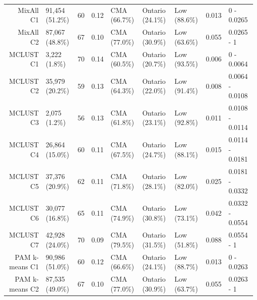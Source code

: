 \documentclass[11pt, a4paper]{article}
\begin{document}
\begin{table}[H]
{\begin{tabular}{|r|llllllll|}
  MixAll C1 & 91,454 (51.2\%) & 60 & 0.12 & CMA (66.7\%) & Ontario (24.1\%) & Low (88.6\%) & 0.013 & 0 - 0.0265 \\
  MixAll C2 & 87,067 (48.8\%) & 67 & 0.10 & CMA (77.0\%) & Ontario (30.9\%) & Low (63.6\%) & 0.055 & 0.0265 - 1 \\
 \rowcolor{gray!25} MCLUST C1 & 3,222 (1.8\%) & 70 & 0.14 & CMA (60.5\%) & Ontario (20.7\%) & Low (93.5\%) & 0.006 & 0 - 0.0064 \\
 \rowcolor{gray!25} MCLUST C2 & 35,979 (20.2\%) & 59 & 0.13 & CMA (64.3\%) & Ontario (22.0\%) & Low (91.4\%) & 0.008 & 0.0064 - 0.0108 \\
 \rowcolor{gray!25} MCLUST C3 & 2,075 (1.2\%) & 56 & 0.13 & CMA (61.8\%) & Ontario (23.1\%) & Low (92.8\%) & 0.011 & 0.0108 - 0.0114 \\
 \rowcolor{gray!25} MCLUST C4 & 26,864 (15.0\%) & 60 & 0.11 & CMA (67.5\%) & Ontario (24.7\%) & Low (88.1\%) & 0.015 & 0.0114 - 0.0181 \\
 \rowcolor{gray!25} MCLUST C5 & 37,376 (20.9\%) & 62 & 0.11 & CMA (71.8\%) & Ontario (28.1\%) & Low (82.0\%) & 0.025 & 0.0181 - 0.0332 \\
 \rowcolor{gray!25} MCLUST C6 & 30,077 (16.8\%) & 65 & 0.11 & CMA (74.9\%) & Ontario (30.8\%) & Low (73.1\%) & 0.042 & 0.0332 - 0.0554 \\
 \rowcolor{gray!25} MCLUST C7 & 42,928 (24.0\%) & 70 & 0.09 & CMA (79.5\%) & Ontario (31.5\%) & Low (51.8\%) & 0.088 & 0.0554 - 1 \\
  PAM k-means C1 & 90,986 (51.0\%) & 60 & 0.12 & CMA (66.6\%) & Ontario (24.1\%) & Low (88.7\%) & 0.013 & 0 - 0.0263 \\
  PAM k-means C2 & 87,535 (49.0\%) & 67 & 0.10 & CMA (77.0\%) & Ontario (30.9\%) & Low (63.7\%) & 0.055 & 0.0263 - 1 \\
   \hline
\end{tabular}
}
\end{table}
\end{document}
